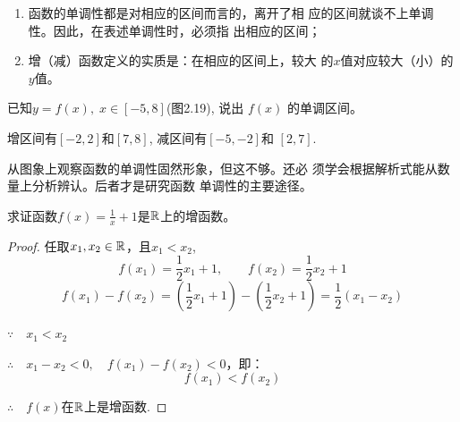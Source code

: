 \begin{note}
\begin{enumerate}
    \item 函数的单调性都是对相应的区间而言的，离开了相
    应的区间就谈不上单调性。因此，在表述单调性时，必须指
    出相应的区间；
    \item 增（减）函数定义的实质是：在相应的区间上，较大
    的$x$值对应较大（小）的$y$值。
\end{enumerate}
\end{note}

\begin{example}
已知$y=f(x),\; x\in[-5,8]$(图2.19), 说出
$f(x)$
的单调区间。
\begin{figure}[htp]
    \centering
{}
    \caption{}
\end{figure}
\end{example}

\begin{solution}
    增区间有$[-2,2]$和$[7,8]$, 减区间有$[-5,-2]$和
$[2,7]$.

从图象上观察函数的单调性固然形象，但这不够。还必
须学会根据解析式能从数量上分析辨认。后者才是研究函数
单调性的主要途径。
\end{solution}

\begin{example}
    求证函数$f(x)=\frac{1}{x}+1$是$\mathbb{R}$上的增函数。
\end{example}

\begin{proof}
任取$x_1,x_2\in\mathbb{R}$，且$x_1<x_2$,
\[f(x_1)=\frac{1}{2}x_1+1,\qquad f(x_2)=\frac{1}{2}x_2+1\]
\[f(x_1)-f(x_2)=\left(\frac{1}{2}x_1+1\right)-\left(\frac{1}{2}x_2+1\right)=\frac{1}{2}(x_1-x_2)\]

$\because\quad x_1<x_2$

$\therefore\quad x_1-x_2<0,\quad f(x_1)-f(x_2)<0$，即：
\[f(x_1)<f(x_2)\]

$\therefore\quad f(x)$在$\mathbb{R}$上是增函数.
\end{proof}

